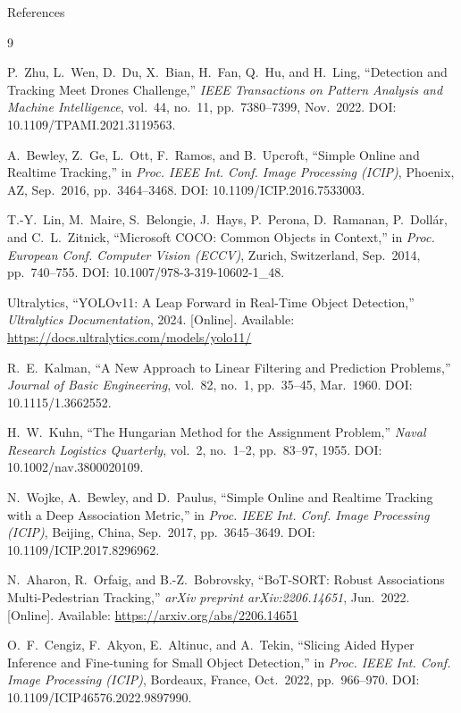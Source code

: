 \documentclass[aspectratio=169]{beamer}
\begin{document}
\begin{frame}[allowframebreaks]{References}
  \footnotesize
  \begin{thebibliography}{9}

    P.~Zhu, L.~Wen, D.~Du, X.~Bian, H.~Fan, Q.~Hu, and H.~Ling,
    ``Detection and Tracking Meet Drones Challenge,''
    \textit{IEEE Transactions on Pattern Analysis and Machine Intelligence},
    vol.~44, no.~11, pp.~7380--7399, Nov.~2022.
    DOI: 10.1109/TPAMI.2021.3119563.

    A.~Bewley, Z.~Ge, L.~Ott, F.~Ramos, and B.~Upcroft,
    ``Simple Online and Realtime Tracking,''
    in \textit{Proc. IEEE Int. Conf. Image Processing (ICIP)},
    Phoenix, AZ, Sep.~2016, pp.~3464--3468.
    DOI: 10.1109/ICIP.2016.7533003.

    T.-Y.~Lin, M.~Maire, S.~Belongie, J.~Hays, P.~Perona, D.~Ramanan,
    P.~Dollár, and C.~L.~Zitnick,
    ``Microsoft COCO: Common Objects in Context,''
    in \textit{Proc. European Conf. Computer Vision (ECCV)},
    Zurich, Switzerland, Sep.~2014, pp.~740--755.
    DOI: 10.1007/978-3-319-10602-1\_48.

    Ultralytics,
    ``YOLOv11: A Leap Forward in Real-Time Object Detection,''
    \textit{Ultralytics Documentation}, 2024.
      [Online]. Available: \url{https://docs.ultralytics.com/models/yolo11/}

    R.~E.~Kalman,
    ``A New Approach to Linear Filtering and Prediction Problems,''
    \textit{Journal of Basic Engineering},
    vol.~82, no.~1, pp.~35--45, Mar.~1960.
    DOI: 10.1115/1.3662552.

    H.~W.~Kuhn,
    ``The Hungarian Method for the Assignment Problem,''
    \textit{Naval Research Logistics Quarterly},
    vol.~2, no.~1--2, pp.~83--97, 1955.
    DOI: 10.1002/nav.3800020109.

    N.~Wojke, A.~Bewley, and D.~Paulus,
    ``Simple Online and Realtime Tracking with a Deep Association Metric,''
    in \textit{Proc. IEEE Int. Conf. Image Processing (ICIP)},
    Beijing, China, Sep.~2017, pp.~3645--3649.
    DOI: 10.1109/ICIP.2017.8296962.

    N.~Aharon, R.~Orfaig, and B.-Z.~Bobrovsky,
    ``BoT-SORT: Robust Associations Multi-Pedestrian Tracking,''
    \textit{arXiv preprint arXiv:2206.14651}, Jun.~2022.
      [Online]. Available: \url{https://arxiv.org/abs/2206.14651}

    O.~F.~Cengiz, F.~Akyon, E.~Altinuc, and A.~Tekin,
    ``Slicing Aided Hyper Inference and Fine-tuning for
    Small Object Detection,''
    in \textit{Proc. IEEE Int. Conf. Image Processing (ICIP)},
    Bordeaux, France, Oct.~2022, pp.~966--970.
    DOI: 10.1109/ICIP46576.2022.9897990.

  \end{thebibliography}
\end{frame}
\end{document}
